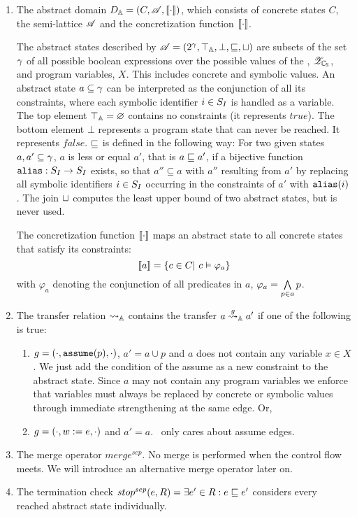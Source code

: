 \begin{enumerate}[leftmargin=*,label=\arabic*.]
\item The abstract domain $D_{\mathbb{A}} = (C, \mathscr{A}, [\![ \cdot ]\!])$,
	which consists of concrete states $C$, the semi-lattice $\mathscr{A}$ and the concretization function $[\![ \cdot ]\!]$.
	
	The abstract states described by $\mathscr{A} = (2^\gamma, \top_{\mathbb{A}}, \bot, \sqsubseteq, \sqcup)$ are subsets of the set $\gamma$ of all possible boolean expressions over the possible values of the \symbolicValueAnalysisCPA, ${\mathscr{Z}_{\mathbb{C_{S}}}}$, and program variables, $X$. This includes concrete and symbolic values. An abstract state $a \subseteq \gamma$ can be interpreted as the conjunction of all its constraints, where each symbolic identifier $i \in S_I$ is handled as a variable.
	The top element $\top_{\mathbb{A}} = \varnothing$ contains no constraints (it represents $true$). The bottom element $\bot$ represents a program state that can never be reached. It represents $false$.
	$\sqsubseteq$ is defined in the following way: For two given states $a, a' \subseteq \gamma$, $a$ is less or equal $a'$, that is $a \sqsubseteq a'$, if a bijective function $\texttt{alias} : S_I \rightarrow S_I$ exists, so that $a'' \subseteq a$ with $a''$ resulting from $a'$ by replacing all symbolic identifiers $i \in S_I$ occurring in the constraints of $a'$ with $\texttt{alias}(i)$.
	The join $\sqcup$ computes the least upper bound of two abstract states, but is never used.

	The concretization function $[\![ \cdot ]\!]$ maps an abstract state to all concrete states that satisfy its constraints:
	\[ [\![ a ]\!] = \{ c \in C |\ c \vDash \varphi_a \} \]
	with $\varphi_a$ denoting the conjunction of all predicates in $a$, $\varphi_a = \bigwedge\limits_{p \in a} p$.

\item The transfer relation $\rightsquigarrow_{\mathbb{A}}$ contains the transfer $a \overset{g}{\rightsquigarrow}_{\mathbb{A}} a'$ if one of the following is true:
	\begin{enumerate}[label=\alph*)]
		\item $g = (\cdot, \texttt{assume}(p), \cdot)$, $a' = a \cup p$ and
			$a$ does not contain any variable $x \in X$.
			We just add the condition of the assume as a new constraint to the abstract state.
			Since $a$ may not contain any program variables we enforce that
			variables must always be replaced by concrete or symbolic values through immediate strengthening at the same edge. Or,
		\item $g = (\cdot, w := e, \cdot)$ and $a' = a$. \ConstraintsCPA\ only cares about assume edges.
	\end{enumerate}
	
\item The merge operator $merge^{sep}$. No merge is performed when the control flow meets. We will introduce an alternative merge operator later on.
\item The termination check $stop^{sep}(e, R) = \exists e' \in R: e \sqsubseteq e'$ considers every reached abstract state individually.
\end{enumerate}


